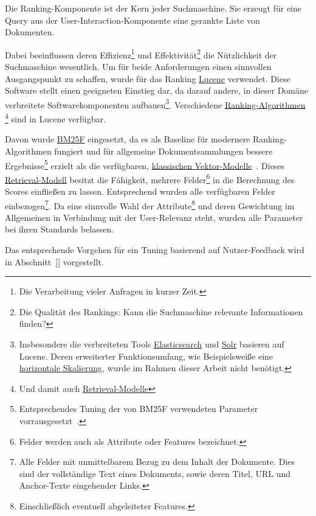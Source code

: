 Die Ranking-Komponente ist der Kern jeder Suchmaschine.
Sie erzeugt für eine Query aus der User-Interaction-Komponente eine gerankte Liste von Dokumenten.

Dabei beeinflussen deren Effizienz\footnote{Die Verarbeitung vieler Anfragen in kurzer Zeit.}
und Effektivität\footnote{Die Qualität des Rankings: Kann die Suchmaschine relevante Informationen finden?}
die Nützlichkeit der Suchmaschine wesentlich.
Um für beide Anforderungen einen sinnvollen Ausgangspunkt zu schaffen, wurde für das Ranking
\href{https://lucene.apache.org/}{Lucene} verwendet.
Diese Software stellt einen geeigneten Einstieg dar, da darauf andere,
in dieser Domäne verbreitete Softwarekomponenten aufbauen\footnote{Insbesondere die verbreiteten Tools\cite{}
\href{https://de.wikipedia.org/wiki/Elasticsearch}{Elasticsearch} und \href{http://lucene.apache.org/solr/}{Solr}
basieren auf Lucene. Deren erweiterter Funktionsumfang, wie Beispielsweiße eine
\href{http://www.searchdatacenter.de/definition/Horizontale-Skalierung-Scale-out}{horizontale Skalierung}, wurde im Rahmen dieser Arbeit nicht benötigt.}.
Verschiedene \href{https://en.wikipedia.org/wiki/Ranking_(information_retrieval)}{Ranking-Algorithmen}
\footnote{Und damit auch 
\href{https://de.wikipedia.org/wiki/Information_Retrieval\#Retrievalmodelle}{Retrieval-Modelle}}
sind in Lucene verfügbar.

Davon wurde \href{https://en.wikipedia.org/wiki/Okapi_BM25}{BM25F} eingesetzt,
da es als Baseline für modernere Ranking-Algorithmen fungiert und für allgemeine
Dokumentsammlungen bessere Ergebnisse\footnote{Entsprechendes Tuning der von BM25F verwendeten Parameter vorrausgesetzt~\cite{baeza_yates.107}.}
erzielt als die verfügbaren,
\href{https://opensourceconnections.com/blog/2015/10/16/bm25-the-next-generation-of-lucene-relevation/}{klassischen Vektor-Modelle}~\cite{baeza_yates.107}.
Dieses \href{https://de.wikipedia.org/wiki/Information_Retrieval#Retrievalmodelle}{Retrieval-Modell}
besitzt die Fähigkeit, mehrere Felder\footnote{Felder werden auch als Attribute oder Features bezeichnet.} in die Berechnung des Scores einfließen zu lassen.
Entsprechend wurden alle verfügbaren Felder 
einbezogen\footnote{Alle Felder mit unmittelbarem Bezug zu dem Inhalt der Dokumente.
Dies sind der vollständige Text eines Dokuments, sowie deren Titel, URL und Anchor-Texte eingehender Links.}.
Da eine sinnvolle Wahl der Attribute\footnote{Einschließlich eventuell abgeleiteter Features.}
und deren Gewichtung im Allgemeinen in
Verbindung mit der User-Relevanz steht, wurden alle Parameter bei ihren Standards belassen.

Das entsprechende Vorgehen für ein Tuning basierend auf Nutzer-Feedback wird in Abschnitt~\ref{} vorgestellt.
